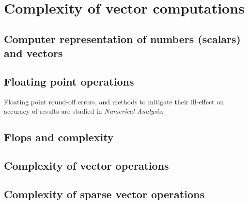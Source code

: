 \documentclass[11pt]{book}
\theoremstyle{definition}
\theoremstyle{plain}
\theoremstyle{problemstyle}
\theoremstyle{remark}
\theoremstyle{definition}
\begin{document}
\section{Complexity of vector computations}
\subsection*{Computer representation of numbers (scalars) and vectors}
\subsection*{Floating point operations}
Floating point round-off errors, and methods to mitigate their ill-effect on accuracy of results are studied in \emph{Numerical Analysis}.
\subsection*{Flops and complexity}
\subsection*{Complexity of vector operations}
\subsection*{Complexity of sparse vector operations}
\end{document}
